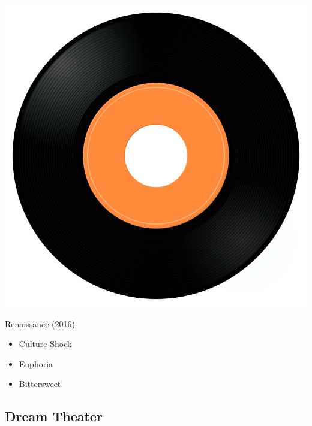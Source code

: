 \begin{minipage}[t]{0.25\textwidth}
\captionsetup{type=figure}
\includegraphics[width=\textwidth]{Images/cover.png}
\caption*{Renaissance (2016)}
\end{minipage}
\begin{minipage}[t]{0.25\textwidth}\vspace{0pt}
\begin{itemize}[nosep,leftmargin=1em,labelwidth=*,align=left]
	\setlength{\itemsep}{0pt}
	\item Culture Shock
	\item Euphoria
	\item Bittersweet
\end{itemize}
\end{minipage}

\subsection{Dream Theater}

